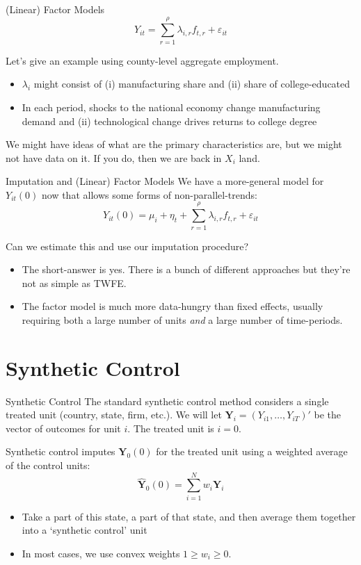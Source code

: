 \documentclass[t]{beamer}
\begin{document}
\begin{frame}{(Linear) Factor Models}
  $$
    Y_{it} = \sum_{r=1}^\rho \lambda_{i, r} f_{t, r} + \varepsilon_{it}
  $$

  \bigskip
  Let's give an example using county-level aggregate employment.
  \begin{itemize}
    \item $\lambda_i$ might consist of (i) manufacturing share and (ii) share of college-educated
    \item In each period, shocks to the national economy change manufacturing demand and (ii) technological change drives returns to college degree
  \end{itemize}

  \pause
  \bigskip
  We might have ideas of what are the primary characteristics are, but we might not have data on it. If you do, then we are back in $X_i$ land.
\end{frame}

\begin{frame}{Imputation and (Linear) Factor Models}
  We have a more-general model for $Y_{it}(0)$ now that allows some forms of non-parallel-trends:
  $$
    Y_{it}(0) =  \mu_i + \eta_t + \sum_{r=1}^\rho \lambda_{i, r} f_{t, r} + \varepsilon_{it}
  $$

  \bigskip\bigskip
  Can we estimate this and use our imputation procedure?
  \begin{itemize}
    \item The short-answer is yes. There is a bunch of different approaches but they're not as simple as TWFE.

    \item The factor model is much more data-hungry than fixed effects, usually requiring both a large number of units \emph{ and } a large number of time-periods.
  \end{itemize}
\end{frame}





\section{Synthetic Control}

\begin{frame}{Synthetic Control}
  The standard synthetic control method considers a single treated unit (country, state, firm, etc.). We will let $\bm{Y}_i = \left( Y_{i1}, \dots, Y_{iT} \right)'$ be the vector of outcomes for unit $i$. The treated unit is $i = 0$.

  \bigskip\pause
  Synthetic control imputes $\bm{Y}_0(0)$ for the treated unit using a weighted average of the control units:
  $$
    \hat{\bm{Y}}_0(0) = \sum_{i = 1}^N w_i \bm{Y}_i
  $$
  \begin{itemize}
    \item Take a part of this state, a part of that state, and then average them together into a `synthetic control' unit
    \item In most cases, we use convex weights $1 \geq w_i \geq 0$.
  \end{itemize}
\end{frame}
\end{document}

